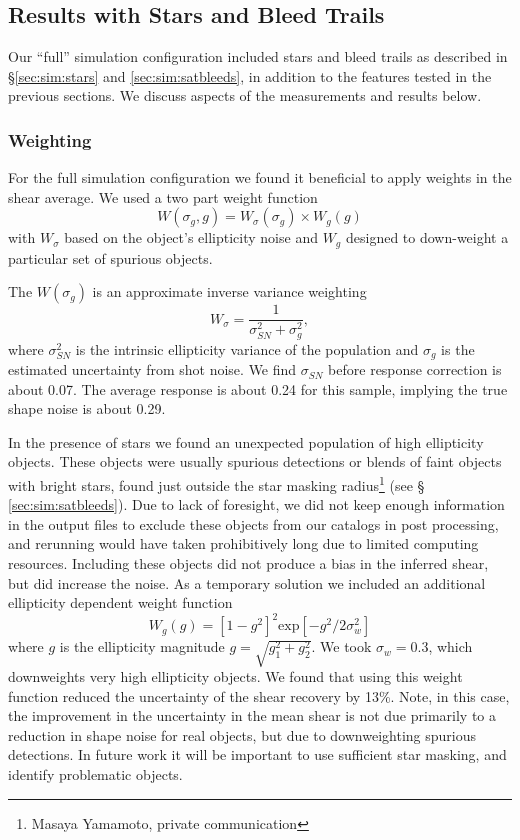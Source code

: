 \documentclass[twocolumn,twocolappendix,astrosym]{openjournal}
\begin{document}
\subsection{Results with Stars and Bleed Trails} \label{sec:results:full}

Our ``full'' simulation configuration included stars and bleed trails as
described in \S \ref{sec:sim:stars} and \ref{sec:sim:satbleeds}, in addition to
the features tested in the previous sections.  We discuss aspects of the
measurements and results below.

\subsubsection{Weighting}

For the full simulation configuration we found it beneficial to apply weights
in the shear average.  We used a two part weight function
\begin{equation}
    W(\sigma_g, g) = W_\sigma (\sigma_g) \times W_g(g)
\end{equation}
with $W_\sigma$ based on the object's ellipticity noise and $W_g$ designed to
down-weight a particular set of spurious objects.

The $W(\sigma_g)$ is an approximate inverse variance weighting
\begin{equation}
    W_\sigma = \frac{1}{\sigma_{SN}^2 + \sigma_g^2},
\end{equation}
where $\sigma^2_{SN}$ is the intrinsic ellipticity variance of the population
and $\sigma_g$ is the estimated uncertainty from shot noise.  We find
$\sigma_{SN}$ before response correction is about 0.07.  The average response
is about 0.24 for this sample, implying the true shape noise is about 0.29.

In the presence of stars we found an unexpected population of high ellipticity
objects.  These objects were usually spurious detections or blends of faint
objects with bright stars, found just outside the star masking
radius\footnote{Masaya Yamamoto, private communication} (see \S
\ref{sec:sim:satbleeds}).  Due to lack of foresight, we did not keep enough
information in the output files to exclude these objects from our catalogs in
post processing, and rerunning would have taken prohibitively long due to
limited computing resources.   Including these objects did not produce a bias
in the inferred shear, but did increase the noise.  As a temporary solution we
included an additional ellipticity dependent weight function \citep{ba14}
\begin{equation}
    W_g(g) = \left[1 - g^2\right]^2 \mathrm{exp}\left[ -g^2/2 \sigma_w^2\right]
\end{equation}
where $g$ is the ellipticity magnitude $g = \sqrt{g_1^2 + g_2^2}$.  We took
$\sigma_w = 0.3$, which downweights very high ellipticity objects.  We found
that using this weight function reduced the uncertainty of the shear recovery
by 13\%.  Note, in this case, the improvement in the uncertainty in the mean
shear is not due primarily to a reduction in shape noise for real objects, but
due to downweighting spurious detections.  In future work it will be important
to use sufficient star masking, and identify problematic objects.
\end{document}
